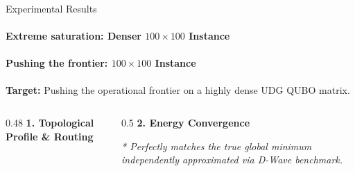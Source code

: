 \documentclass[10pt, aspectratio=169]{beamer}
\begin{document}
\begin{frame}{Experimental Results}
\framesubtitle{Extreme saturation: Denser $100 \times 100$ Instance}
\framesubtitle{Pushing the frontier: $100 \times 100$ Instance}
    \textbf{Target:} Pushing the operational frontier on a highly dense UDG QUBO matrix.
    \vspace{0.4cm}

    \begin{columns}[T]
        \begin{column}{0.48\textwidth}
            \textbf{1. Topological Profile \& Routing}
            \vspace{0.2cm}
            
        \end{column}
        
        \begin{column}{0.5\textwidth}
            \textbf{2. Energy Convergence}
            \vspace{0.2cm}
            
            
            \vspace{0.4cm}
            {\small \textit{* Perfectly matches the true global minimum independently approximated via D-Wave benchmark.}}
        \end{column}
    \end{columns}
\end{frame}
\end{document}
